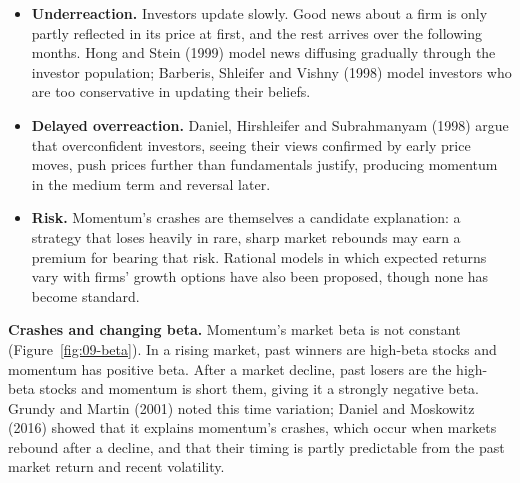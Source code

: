 \begin{itemize}
  \item \textbf{Underreaction.} Investors update slowly. Good news about a firm is only partly reflected in its price at first, and the rest arrives over the following months. Hong and Stein (1999) model news diffusing gradually through the investor population; Barberis, Shleifer and Vishny (1998) model investors who are too conservative in updating their beliefs.
  \item \textbf{Delayed overreaction.} Daniel, Hirshleifer and Subrahmanyam (1998) argue that overconfident investors, seeing their views confirmed by early price moves, push prices further than fundamentals justify, producing momentum in the medium term and reversal later.
  \item \textbf{Risk.} Momentum's crashes are themselves a candidate explanation: a strategy that loses heavily in rare, sharp market rebounds may earn a premium for bearing that risk. Rational models in which expected returns vary with firms' growth options have also been proposed, though none has become standard.
\end{itemize}

\textbf{Crashes and changing beta.} Momentum's market beta is not constant (Figure~\ref{fig:09-beta}). In a rising market, past winners are high-beta stocks and momentum has positive beta. After a market decline, past losers are the high-beta stocks and momentum is short them, giving it a strongly negative beta. Grundy and Martin (2001) noted this time variation; Daniel and Moskowitz (2016) showed that it explains momentum's crashes, which occur when markets rebound after a decline, and that their timing is partly predictable from the past market return and recent volatility.

